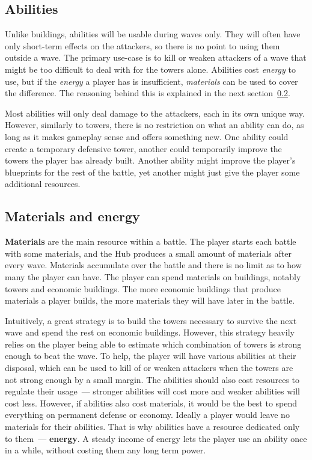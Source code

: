 \subsection{Abilities}\label{sec:design-abilities}

Unlike buildings, abilities will be usable during waves only.
They will often have only short-term effects on the attackers, so there is no point to using them outside a wave.
The primary use-case is to kill or weaken attackers of a wave that might be too difficult to deal with for the towers alone.
Abilities cost \emph{energy} to use, but if the \emph{energy} a player has is insufficient, \emph{materials} can be used to cover the difference.
The reasoning behind this is explained in the next section~\ref{sec:design-materials-and-energy}.

Most abilities will only deal damage to the attackers, each in its own unique way.
However, similarly to towers, there is no restriction on what an ability can do, as long as it makes gameplay sense and offers something new.
One ability could create a temporary defensive tower, another could temporarily improve the towers the player has already built.
Another ability might improve the player's blueprints for the rest of the battle, yet another might just give the player some additional resources.

\subsection{Materials and energy}\label{sec:design-materials-and-energy}

\textbf{Materials} are the main resource within a battle.
The player starts each battle with some materials, and the Hub produces a small amount of materials after every wave.
Materials accumulate over the battle and there is no limit as to how many the player can have.
The player can spend materials on buildings, notably towers and economic buildings.
The more economic buildings that produce materials a player builds, the more materials they will have later in the battle.

Intuitively, a great strategy is to build the towers necessary to survive the next wave and spend the rest on economic buildings.
However, this strategy heavily relies on the player being able to estimate which combination of towers is strong enough to beat the wave.
To help, the player will have various abilities at their disposal, which can be used to kill of or weaken attackers when the towers are not strong enough by a small margin.
The abilities should also cost resources to regulate their usage~--- stronger abilities will cost more and weaker abilities will cost less.
However, if abilities also cost materials, it would be the best to spend everything on permanent defense or economy.
Ideally a player would leave no materials for their abilities.
That is why abilities have a resource dedicated only to them~--- \textbf{energy}.
A steady income of energy lets the player use an ability once in a while, without costing them any long term power.

